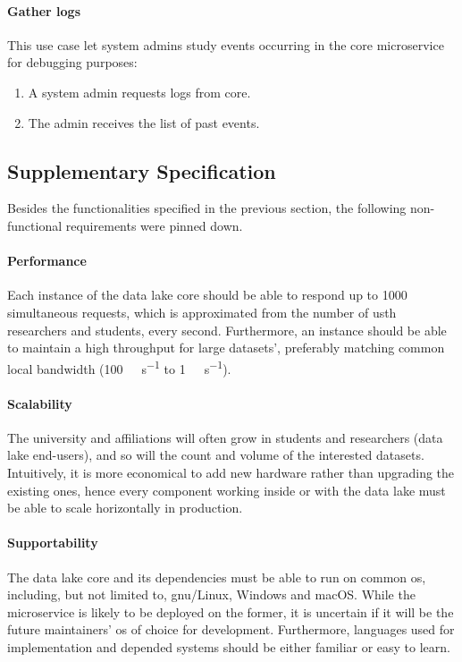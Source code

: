 \paragraph{Gather logs}  This use case let system admins study
events occurring in the core microservice for debugging purposes:
\begin{enumerate}
  \item A system admin requests logs from core.
  \item The admin receives the list of past events.
\end{enumerate}

\subsection{Supplementary Specification}
Besides the functionalities specified in the previous section,
the following non-functional requirements were pinned down.

\paragraph{Performance}  Each instance of the data lake core should be able
to respond up to 1000 simultaneous requests, which is approximated
from the number of \gls{usth} researchers and students, every second.
Furthermore, an instance should be able to maintain a high throughput
for large datasets', preferably matching common local bandwidth
(\SI{100}{\mega\bit\per\second} to \SI{1}{\giga\bit\per\second}).

\paragraph{Scalability} The university and affiliations will often grow
in students and researchers (data lake end-users), and so will the count
and volume of the interested datasets.  Intuitively, it is more economical
to add new hardware rather than upgrading the existing ones, hence
every component working inside or with the data lake must be able to
scale horizontally in production.

\paragraph{Supportability}  The data lake core and its dependencies must
be able to run on common \gls{os}, including, but not limited to,
\acrshort{gnu}/Linux, Windows and macOS.  While the microservice is likely
to be deployed on the former, it is uncertain if it will be
the future maintainers' \gls{os} of choice for development.  Furthermore,
languages used for implementation and depended systems should be
either familiar or easy to learn.

